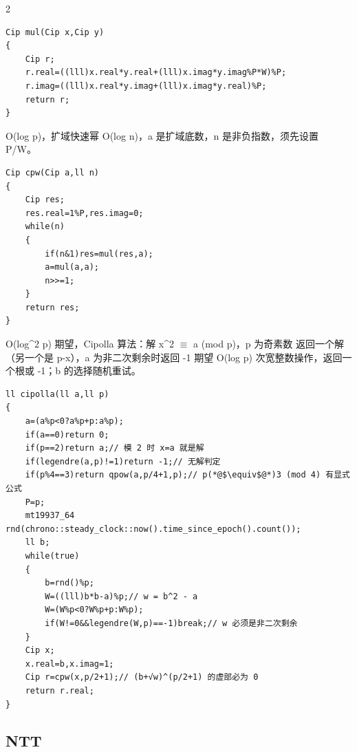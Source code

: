 \documentclass[UTF8,fontset=fandol,a4paper,twoside]{ctexart}
\newcommand{\note}[1]{{\fontsize{10}{12}\selectfont #1\par}}
\begin{document}
\begin{multicols}{2}
\begin{lstlisting}
Cip mul(Cip x,Cip y)
{
    Cip r;
    r.real=((lll)x.real*y.real+(lll)x.imag*y.imag%P*W)%P;
    r.imag=((lll)x.real*y.imag+(lll)x.imag*y.real)%P;
    return r;
}
\end{lstlisting}
\note{O(\allowbreak{}log p)\allowbreak{}，扩域快速幂 O(\allowbreak{}log n)\allowbreak{}，a 是扩域底数，n 是非负指数，须先设置 P/\allowbreak{}W。}
\begin{lstlisting}
Cip cpw(Cip a,ll n)
{
    Cip res;
    res.real=1%P,res.imag=0;
    while(n)
    {
        if(n&1)res=mul(res,a);
        a=mul(a,a);
        n>>=1;
    }
    return res;
}
\end{lstlisting}
\note{O(\allowbreak{}log\textasciicircum{}2 p)\allowbreak{} 期望，Cipolla 算法：解 x\textasciicircum{}2 \ensuremath{\equiv} a (\allowbreak{}mod p)\allowbreak{}，p 为奇素数 返回一个解（另一个是 p-\allowbreak{}x），a 为非二次剩余时返回 -\allowbreak{}1 期望 O(\allowbreak{}log p)\allowbreak{} 次宽整数操作，返回一个根或 -\allowbreak{}1；b 的选择随机重试。}
\begin{lstlisting}
ll cipolla(ll a,ll p)
{
    a=(a%p<0?a%p+p:a%p);
    if(a==0)return 0;
    if(p==2)return a;// 模 2 时 x=a 就是解
    if(legendre(a,p)!=1)return -1;// 无解判定
    if(p%4==3)return qpow(a,p/4+1,p);// p(*@$\equiv$@*)3 (mod 4) 有显式公式
    P=p;
    mt19937_64 rnd(chrono::steady_clock::now().time_since_epoch().count());
    ll b;
    while(true)
    {
        b=rnd()%p;
        W=((lll)b*b-a)%p;// w = b^2 - a
        W=(W%p<0?W%p+p:W%p);
        if(W!=0&&legendre(W,p)==-1)break;// w 必须是非二次剩余
    }
    Cip x;
    x.real=b,x.imag=1;
    Cip r=cpw(x,p/2+1);// (b+√w)^(p/2+1) 的虚部必为 0
    return r.real;
}
\end{lstlisting}
\subsection{NTT}


\end{multicols}
\end{document}
